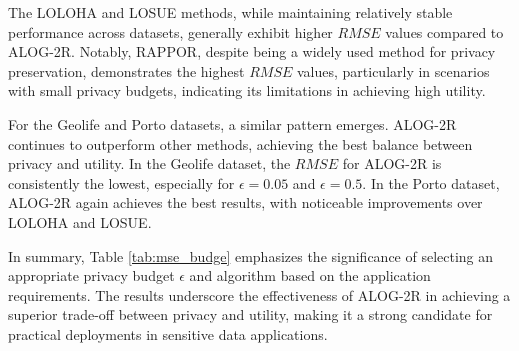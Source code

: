 The LOLOHA and LOSUE methods, while maintaining relatively stable performance across datasets, generally exhibit higher $RMSE$ values compared to ALOG-2R. Notably, RAPPOR, despite being a widely used method for privacy preservation, demonstrates the highest $RMSE$ values, particularly in scenarios with small privacy budgets, indicating its limitations in achieving high utility.

For the Geolife and Porto datasets, a similar pattern emerges. ALOG-2R continues to outperform other methods, achieving the best balance between privacy and utility. In the Geolife dataset, the $RMSE$ for ALOG-2R is consistently the lowest, especially for $\epsilon = 0.05$ and $\epsilon = 0.5$. In the Porto dataset, ALOG-2R again achieves the best results, with noticeable improvements over LOLOHA and LOSUE.   %

In summary, Table \ref{tab:mse_budge} emphasizes the significance of selecting an appropriate privacy budget $\epsilon$ and algorithm based on the application requirements. The results underscore the effectiveness of ALOG-2R in achieving a superior trade-off between privacy and utility, making it a strong candidate for practical deployments in sensitive data applications.



